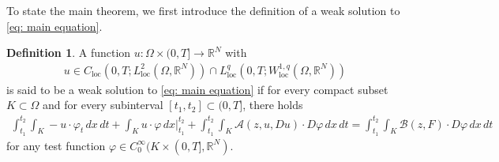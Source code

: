 \documentclass[11pt,oneside, english,reqno,twoside a4paper]{amsart}
\theoremstyle{definition}
\newtheorem{definition}{Definition}[section]
\numberwithin{theorem}{section}
\numberwithin{equation}{section}
\newcommand{\aaa}{{\mathcal{A}}}  %
\newcommand{\RRN}{\mathbb{R}^{N}}
\newcommand{\loc}{\mathrm{loc}}
\begin{document}
To state the main theorem, we first introduce the definition of a weak solution to \cref{eq: main equation}.
\begin{definition}\label{weak solution}
	A function $u : \Omega\times (0, T] \to \mathbb{R}^N$ with 
	\begin{align*}
		u \in C_{\loc}\left(0,T; L^2_{\loc}\left(\Omega, \mathbb{R}^N\right)\right)\cap L^q_{\loc}\left(0, T; W^{1, q}_{\loc}\left(\Omega, \mathbb{R}^N\right)\right)
	\end{align*}
	is said to be a weak solution to \eqref{eq: main equation} if for every compact subset $K\subset \Omega$ and for every subinterval $[t_1, t_2]\subset (0, T]$, there holds
	\begin{align*}
		\int_{t_1}^{t_2}\int_K -u\cdot \varphi_t \,dx\,dt+\int_{K}u \cdot \varphi \, dx\Big|_{t_1}^{t_2}+\int_{t_1}^{t_2} \int_K \aaa(z, u, D u)\cdot D \varphi \,dx \,dt=\int_{t_1}^{t_2}\int_{K} \mathcal{B}(z, F)\cdot D\varphi\, dx\, dt
	\end{align*}
	for any test function $\varphi \in C^{\infty}_0 (K \times(0, T], \mathbb{R}^N).$ %
\end{definition}
\end{document}
